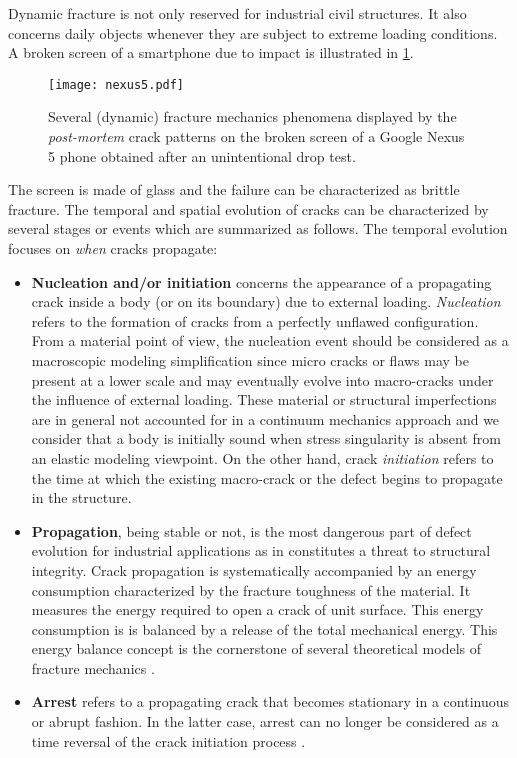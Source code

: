 Dynamic fracture is not only reserved for industrial civil structures. It also concerns daily objects whenever they are subject to extreme loading conditions. A broken screen of a smartphone due to impact is illustrated in \cref{fig:nexus5}.
\begin{figure}[htbp]
\centering
\texttt{[image: nexus5.pdf]}
\caption{Several (dynamic) fracture mechanics phenomena displayed by the \emph{post-mortem} crack patterns on the broken screen of a Google Nexus 5 phone obtained after an unintentional drop test.} \label{fig:nexus5}
\end{figure}
The screen is made of glass and the failure can be characterized as brittle fracture. The temporal and spatial evolution of cracks can be characterized by several stages or events which are summarized as follows. The temporal evolution focuses on \emph{when} cracks propagate:
\begin{itemize}
\item \textbf{Nucleation and/or initiation} concerns the appearance of a propagating crack inside a body (or on its boundary) due to external loading. \emph{Nucleation} refers to the formation of cracks from a perfectly unflawed configuration. From a material point of view, the nucleation event should be considered as a macroscopic modeling simplification since micro cracks or flaws may be present at a lower scale and may eventually evolve into macro-cracks under the influence of external loading. These material or structural imperfections are in general not accounted for in a continuum mechanics approach and we consider that a body is initially sound when stress singularity is absent from an elastic modeling viewpoint. On the other hand, crack \emph{initiation} refers to the time at which the existing macro-crack or the defect begins to propagate in the structure.

\item \textbf{Propagation}, being stable or not, is
the most dangerous part of defect evolution for industrial applications as in constitutes a threat to structural integrity. Crack propagation is systematically accompanied by an energy consumption characterized by the fracture toughness of the material. It measures the energy required to open a crack of unit surface. This energy consumption is is balanced by a release of the total mechanical energy. This energy balance concept is the cornerstone of several theoretical models of fracture mechanics \cite{Griffith:1921,Mott:1947}.

\item \textbf{Arrest} refers to a propagating crack that becomes stationary in a continuous or abrupt fashion. In the latter case, arrest can no longer be considered as a time reversal of the crack initiation process \cite{Ravi-ChandarKnauss:1984c}.
\end{itemize}

